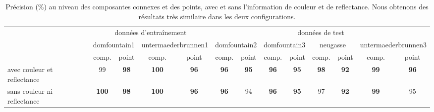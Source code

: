 \begin{table}[]
\tiny
\begin{tabular}{l|c|c|c|c|c|c|c|c|c|c|c|c|}
\cline{2-13}
                                                  & \multicolumn{4}{c|}{données d'entraînement}                                  & \multicolumn{8}{c|}{données de test}                                                                                                             \\ \cline{2-13} 
                                                  & \multicolumn{2}{c|}{domfountain1} & \multicolumn{2}{c|}{untermaederbrunnen1} & \multicolumn{2}{c|}{domfountain2} & \multicolumn{2}{c|}{domfountain3} & \multicolumn{2}{c|}{neugasse} & \multicolumn{2}{c|}{untermaederbrunnen3} \\ \cline{2-13} 
                                                  & comp.            & point          & comp.               & point              & comp.           & point           & comp.           & point           & comp.         & point         & comp.               & point              \\ \hline
\multicolumn{1}{|l|}{avec couleur et reflectance} & 99               & \textbf{98}    & \textbf{100}        & \textbf{96}        & \textbf{96}     & \textbf{95}     & \textbf{96}     & \textbf{95}     & \textbf{98}   & \textbf{92}   & \textbf{99}         & \textbf{96}        \\ \hline
\multicolumn{1}{|l|}{sans couleur ni reflectance} & \textbf{100}     & \textbf{98}    & \textbf{100}        & \textbf{96}        & \textbf{96}     & 94              & \textbf{96}     & \textbf{95}     & 97            & \textbf{92}   & \textbf{99}         & 95                 \\ \hline
\end{tabular}
\caption{Précision (\%) au niveau des composantes connexes et des points, avec et sans l'information de couleur et de reflectance. Nous obtenons des résultats très similaire dans les deux configurations.}
\label{table:laser_color}
\end{table}